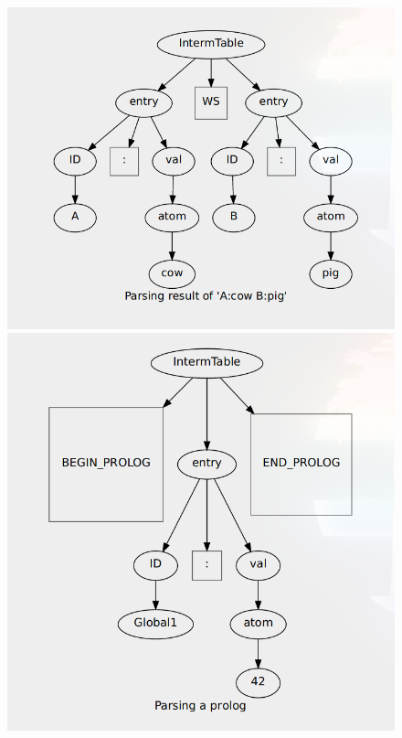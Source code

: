 \documentclass{article}
\begin{document}
    \begin{figure}[!htbp]
      \begin{center}
        \includegraphics{regular.png}
        \includegraphics{prolog.png}

\end{center}
\end{figure}
\end{document}
